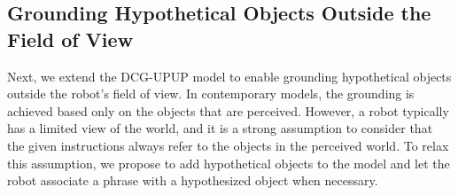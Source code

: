 %
%

\subsection{Grounding Hypothetical Objects Outside the Field of View}
Next, we extend the DCG-UPUP model to enable grounding hypothetical objects outside the robot's field of view. In contemporary models, the grounding is achieved based only on the objects that are perceived. However, a robot typically has a limited view of the world, and it is a strong assumption to consider that the given instructions always refer to the objects in the perceived world. To relax this assumption, we propose to add hypothetical objects to the model and let the robot associate a phrase with a hypothesized object when necessary.   

